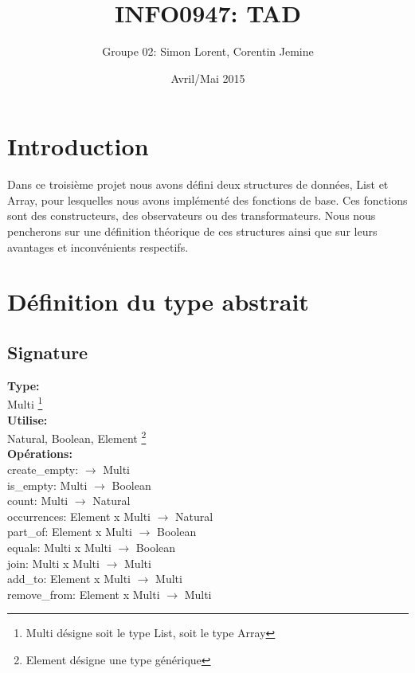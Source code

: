 \documentclass[a4paper, 11pt, oneside]{article}
\begin{document}
	
\newcommand*{\cpl}[1]{\color{mymauve}\hfill\makebox[4.5cm][l]{#1}}

\title{INFO0947: TAD}
\author{Groupe 02: Simon Lorent, Corentin Jemine}
\date{Avril/Mai 2015}

\maketitle
\clearpage

\section{Introduction}
	Dans ce troisième projet nous avons défini deux structures de données, List et Array, pour lesquelles nous avons implémenté des fonctions de base. Ces fonctions sont des constructeurs, des observateurs ou des transformateurs. Nous nous pencherons sur une définition théorique de ces structures ainsi que sur leurs avantages et inconvénients respectifs.

\section{Définition du type abstrait}
	\subsection{Signature}
	\noindent \textbf{Type:}
	\\ \indent Multi \footnote{Multi désigne soit le type List, soit le type Array}
	\\ \textbf{Utilise:}
	\\ \indent Natural, Boolean, Element \footnote{Element désigne une type générique}
	\\ \textbf{Opérations:}
	\\ \indent create\_empty: $\rightarrow$ Multi
	\\ \indent is\_empty: Multi $\rightarrow$ Boolean
	\\ \indent count: Multi $\rightarrow$ Natural
	\\ \indent occurrences: Element x Multi $\rightarrow$ Natural
	\\ \indent part\_of: Element x Multi $\rightarrow$ Boolean
	\\ \indent equals: Multi x Multi $\rightarrow$ Boolean
	\\ \indent join: Multi x Multi $\rightarrow$ Multi
	\\ \indent add\_to: Element x Multi $\rightarrow$ Multi
	\\ \indent remove\_from: Element x Multi $\rightarrow$ Multi
	
\end{document}
